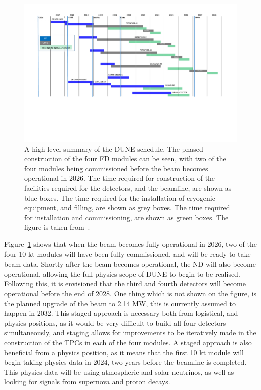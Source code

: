 \begin{figure}
  \centering
  \includegraphics[width=\textwidth]{summary-schedule}
  \caption[A high level summary of the DUNE schedule]
          {A high level summary of the DUNE schedule. The phased construction of the four FD modules can be seen, with two of the four modules being commissioned before the beam becomes operational in 2026. The time required for construction of the facilities required for the detectors, and the beamline, are shown as blue boxes. The time required for the installation of cryogenic equipment, and filling, are shown as grey boxes. The time required for installation and commissioning, are shown as green boxes. The figure is taken from~\citep{DUNECDR_V1}.}
  \label{fig:DUNE_Sched}
\end{figure}

Figure~\ref{fig:DUNE_Sched} shows that when the beam becomes fully operational in 2026, two of the four 10 kt modules will have been fully commissioned, and will be ready to take beam data. Shortly after the beam becomes operational, the ND will also become operational, allowing the full physics scope of DUNE to begin to be realised. Following this, it is envisioned that the third and fourth detectors will become operational before the end of 2028. One thing which is not shown on the figure, is the planned upgrade of the beam to 2.14 MW, this is currently assumed to happen in 2032. This staged approach is necessary both from logistical, and physics positions, as it would be very difficult to build all four detectors simultaneously, and staging allows for improvements to be iteratively made in the construction of the TPCs in each of the four modules. A staged approach is also beneficial from a physics position, as it means that the first 10 kt module will begin taking physics data in 2024, two years before the beamline is completed. This physics data will be using atmospheric and solar neutrinos, as well as looking for signals from supernova and proton decays. \\

